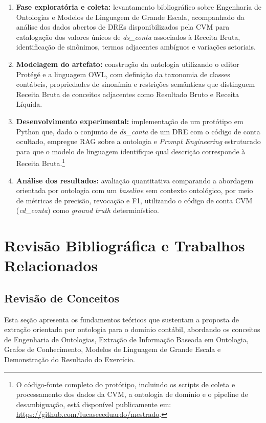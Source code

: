 \documentclass[12pt,a4paper]{article}
\begin{document}
\begin{enumerate}
    \item \textbf{Fase exploratória e coleta:} levantamento bibliográfico sobre Engenharia de Ontologias e Modelos de Linguagem de Grande Escala, acompanhado da análise dos dados abertos de DREs disponibilizados pela CVM para catalogação dos valores únicos de \textit{ds\_conta} associados à Receita Bruta, identificação de sinônimos, termos adjacentes ambíguos e variações setoriais.
    \item \textbf{Modelagem do artefato:} construção da ontologia utilizando o editor Prot\'eg\'e e a linguagem OWL, com definição da taxonomia de classes contábeis, propriedades de sinonímia e restrições semânticas que distinguem Receita Bruta de conceitos adjacentes como Resultado Bruto e Receita Líquida.
    \item \textbf{Desenvolvimento experimental:} implementação de um protótipo em Python que, dado o conjunto de \textit{ds\_conta} de um DRE com o código de conta ocultado, empregue RAG sobre a ontologia e \textit{Prompt Engineering} estruturado para que o modelo de linguagem identifique qual descrição corresponde à Receita Bruta.\footnote{O código-fonte completo do protótipo, incluindo os scripts de coleta e processamento dos dados da CVM, a ontologia de domínio e o pipeline de desambiguação, está disponível publicamente em: \url{https://github.com/lucaseeeduardo/mestrado}.}
    \item \textbf{Análise dos resultados:} avaliação quantitativa comparando a abordagem orientada por ontologia com um \textit{baseline} sem contexto ontológico, por meio de métricas de precisão, revocação e F1, utilizando o código de conta CVM (\textit{cd\_conta}) como \textit{ground truth} determinístico.
\end{enumerate}

\section{Revisão Bibliográfica e Trabalhos Relacionados}

\subsection{Revisão de Conceitos}

Esta seção apresenta os fundamentos teóricos que sustentam a proposta de extração orientada por ontologia para o domínio contábil, abordando os conceitos de Engenharia de Ontologias, Extração de Informação Baseada em Ontologia, Grafos de Conhecimento, Modelos de Linguagem de Grande Escala e Demonstração do Resultado do Exercício.
\end{document}
